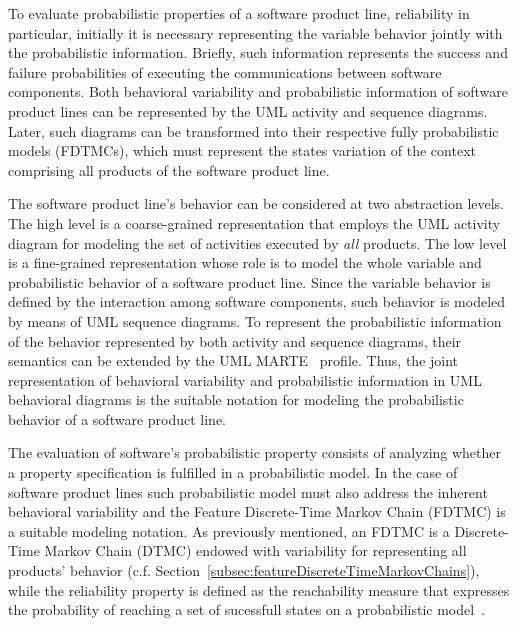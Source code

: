 
To evaluate  probabilistic properties of a software product line, reliability
in particular, initially it is necessary representing the variable behavior
jointly with the probabilistic information. Briefly, such information
represents the success and failure probabilities of executing the
communications between software components. Both behavioral variability and
probabilistic information of software product lines can be represented by the
UML activity and sequence diagrams. Later, such diagrams can be transformed
into their respective fully probabilistic models (FDTMCs), which must represent the
states variation of the context comprising all products of the software product
line. 

The software product line's behavior can be considered at two abstraction
levels. The high level is a coarse-grained representation that employs the UML
activity diagram for modeling the set of activities executed by \emph{all} products.
The low level is a fine-grained representation whose role is to model the whole
variable and probabilistic behavior of a software product line. Since the
variable behavior is defined by the interaction among software components,
such behavior is modeled by means of UML sequence diagrams. To represent the
probabilistic information of the behavior represented by both activity and
sequence diagrams, their semantics  can be extended by the UML
MARTE~\cite{uml-marte-profile} profile.  Thus, the joint representation of
behavioral variability and probabilistic information in UML behavioral diagrams
is the suitable notation for modeling the probabilistic behavior of a software
product line. 

The evaluation of software's probabilistic property consists of analyzing
whether a property specification is fulfilled in a probabilistic model. In the
case of software product lines such probabilistic model must also address the
inherent behavioral variability and the Feature Discrete-Time Markov Chain
(FDTMC) is a suitable modeling notation. As previously mentioned, an FDTMC is a
Discrete-Time Markov Chain (DTMC) endowed with variability for representing all
products' behavior (c.f. Section~\ref{subsec:featureDiscreteTimeMarkovChains}),
while the reliability property is defined as the reachability measure that
expresses the probability of reaching a set of sucessfull states on a
probabilistic model~\cite{grunske_specification_2008}. 

